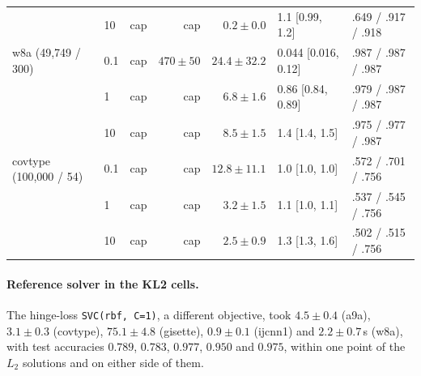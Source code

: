 \documentclass{opt2026}   %
\begin{document}
\begin{table}[h]
\begin{tabular}{llrrrll}
 & 10 & cap & cap & $0.2\pm0.0$ & 1.1 [0.99, 1.2] & .649 / .917 / .918 \\
w8a (49,749 / 300) & 0.1 & cap & $470\pm50$ & $24.4\pm32.2$ & 0.044 [0.016, 0.12] & .987 / .987 / .987 \\
 & 1 & cap & cap & $6.8\pm1.6$ & 0.86 [0.84, 0.89] & .979 / .987 / .987 \\
 & 10 & cap & cap & $8.5\pm1.5$ & 1.4 [1.4, 1.5] & .975 / .977 / .987 \\
covtype (100,000 / 54) & 0.1 & cap & cap & $12.8\pm11.1$ & 1.0 [1.0, 1.0] & .572 / .701 / .756 \\
 & 1 & cap & cap & $3.2\pm1.5$ & 1.1 [1.0, 1.1] & .537 / .545 / .756 \\
 & 10 & cap & cap & $2.5\pm0.9$ & 1.3 [1.3, 1.6] & .502 / .515 / .756 \\
\bottomrule
\end{tabular}
\end{table}

\paragraph{Reference solver in the KL2 cells.} The hinge-loss
\texttt{SVC(rbf, C=1)}, a different objective, took $4.5\pm0.4$ (a9a),
$3.1\pm0.3$ (covtype), $75.1\pm4.8$ (gisette), $0.9\pm0.1$ (ijcnn1) and
$2.2\pm0.7$\,s (w8a), with test accuracies $0.789$, $0.783$, $0.977$,
$0.950$ and $0.975$, within one point of the $L_2$ solutions and on
either side of them.
\end{document}

